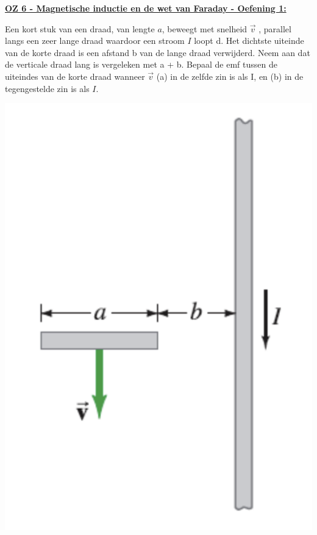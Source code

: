\textbf{\underline{OZ 6 - Magnetische inductie en de wet van Faraday - Oefening 1:}}
\vspace{0.5cm}

    \vspace{-0.5cm}\begin{minipage}{.8\textwidth}
        Een kort stuk van een draad, van lengte $a$, beweegt met snelheid $\vec{v}$ , parallel langs
        een zeer lange draad waardoor een stroom $I$ loopt d. Het dichtste uiteinde
        van de korte draad is een afstand b van de lange draad verwijderd. Neem aan dat de
        verticale draad lang is vergeleken met a + b. Bepaal de emf tussen de uiteindes van
        de korte draad wanneer $\vec{v}$ (a) in de zelfde zin is als I, en (b) in de tegengestelde zin
        is als $I$.
    \end{minipage}
    \hspace{0.5cm}\begin{minipage}{.16\textwidth}
        \includegraphics[scale = 0.25]{oz06/resources/Oz6Oef1.png}
    \end{minipage}

    \begin{description}[labelwidth=1.5cm, leftmargin=!]
        \item[Geg. :]
        \item[Gevr. :] 
        \item[Opl. :]
    \end{description}


\vspace{1cm}
